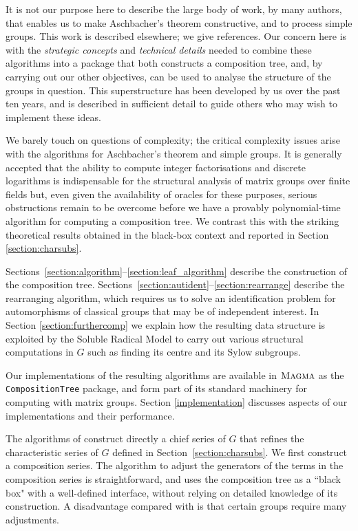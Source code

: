 \documentclass[12pt,twoside,reqno,psamsfonts]{amsproc}
\newcommand{\comment}[1]{\marginpar{\begin{center}\scriptsize{#1}\end{center}}}
\numberwithin{equation}{section}
\numberwithin{figure}{section}
\newcounter{algorithm}
\theoremstyle{plain}
\theoremstyle{definition}
\theoremstyle{remark}
\newcommand{\MAGMA}{\textsc{Magma}}
\begin{document}
It is not our purpose here to describe
the large body of work, by many authors, that enables
us to make Aschbacher's theorem constructive, and to process simple groups.
This work is described elsewhere; we give references.  Our concern here
is with the {\it strategic concepts} and {\it technical details}
needed to combine these algorithms into a package that both
constructs a composition tree, and, by
carrying out our other objectives, can be used to analyse the structure
of the groups in question.  This superstructure
has been developed by us over the past ten years, and is described in
sufficient detail to guide others who may wish to implement these ideas.  

We barely touch on questions of complexity;  the critical complexity issues
arise with the algorithms for Aschbacher's theorem and simple groups.  
It is generally accepted that the ability to compute integer factorisations and
\comment{DFH: expanded this sentence.}
discrete logarithms is indispensable for the structural analysis of matrix
groups over finite fields but, even given the availability of oracles for
these purposes, serious obstructions remain to be overcome before we have a
provably polynomial-time algorithm for computing a composition tree.
We contrast this with the striking theoretical results obtained in
the black-box context \cite{BBS} and reported in Section 
\ref{section:charsubs}.

Sections~\ref{section:algorithm}--\ref{section:leaf_algorithm} 
describe the construction of the composition tree.
Sections~\ref{section:autident}--\ref{section:rearrange}
describe the rearranging algorithm, which requires us to solve an
identification problem for automorphisms of classical groups that may
be of independent interest.
In Section \ref{section:furthercomp} we explain
how the resulting data structure 
is exploited by the Soluble Radical Model
to carry out various structural computations 
in $G$ such as finding its centre and its Sylow
subgroups.  

Our implementations of the resulting algorithms are 
available in $\MAGMA$ %
as the \texttt{CompositionTree} package,
and form part of its standard machinery 
for computing with matrix groups. 
Section \ref{implementation} discusses aspects
of our implementations and their performance. 

The algorithms of \cite{MR2429998, statherthesis} construct
directly a chief series of $G$ that refines
the characteristic series of $G$ defined in Section~\ref{section:charsubs}.
We first construct a composition series.
The algorithm to adjust the generators of the terms in
the composition series is straightforward,
and uses the composition tree as a ``black box" with a well-defined
interface, without relying on detailed knowledge of its construction.
A disadvantage compared with \cite{MR2429998} is that certain 
groups require many adjustments. 
\end{document}

